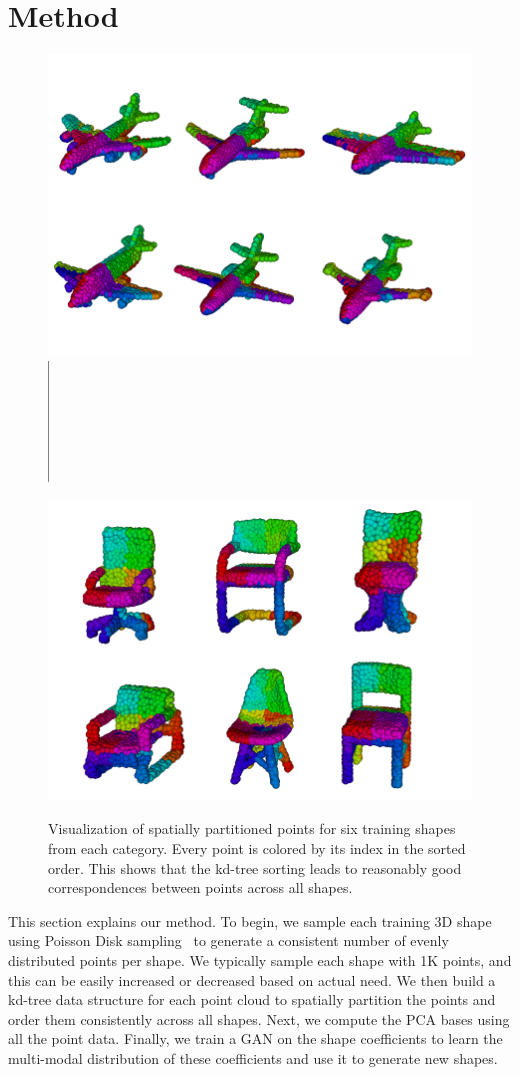 \section{Method}\label{pca:method}

\begin{figure}
\centering
\includegraphics[width=0.49\linewidth]{PCAGAN/images/airplanes_sorting_new2.png}
\includegraphics[height=1.4in]{PCAGAN/images/vline.png}
\includegraphics[width=0.49\linewidth]{PCAGAN/images/chairs_sorting.png}
\vspace{-12pt}
\caption{\small \label{fig:point_sorting} Visualization of spatially partitioned points for six training shapes from each category. Every point is colored by its index in the sorted order. This shows that the kd-tree sorting leads to reasonably good correspondences between points across all shapes.}
\vspace{-12pt} 
\end{figure}

This section explains our method. To begin, we sample each training 3D shape using Poisson Disk sampling~\cite{Bowers:2010:PPD} to generate a consistent number of evenly distributed points per shape. We typically sample each shape with 1K points, and this can be easily increased or decreased based on actual need. We then build a kd-tree data structure for each point cloud to spatially partition the points and order them consistently across all shapes. Next, we compute the PCA bases using all the point data. 
Finally, we train a GAN on the shape coefficients to learn the multi-modal distribution of these coefficients and use it to generate new shapes.

